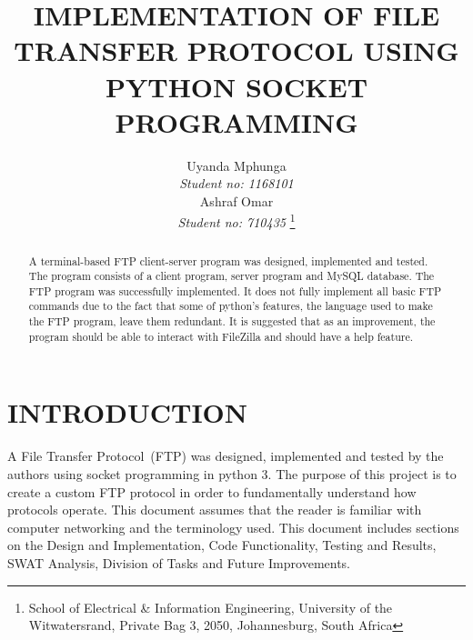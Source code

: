 \documentclass[journal, a4paper]{IEEEtran}
\begin{document}
\title{IMPLEMENTATION OF FILE TRANSFER PROTOCOL USING PYTHON SOCKET PROGRAMMING}

\author{Uyanda Mphunga \\ \textit{Student no: 1168101}\\ Ashraf Omar\\ \textit{Student no: 710435}
	\thanks{School of Electrical \& Information Engineering, University of the
		Witwatersrand, Private Bag 3, 2050, Johannesburg, South Africa}
}


%



\maketitle
\thispagestyle{empty}\pagestyle{empty}

\newlength\tindent
\setlength{\tindent}{\parindent}
\setlength{\parindent}{0pt}
\renewcommand{\indent}{\hspace*{\tindent}}

\begin{abstract}
A terminal-based FTP client-server program was designed, implemented and tested. The program consists of a client program, server program and MySQL database. The FTP program was successfully implemented. It does not fully implement all basic FTP commands due to the fact that some of python's features, the language used to make the FTP program, leave them redundant. It is suggested that as an improvement, the program should be able to interact with FileZilla and should have a help feature.
\end{abstract}

%
\section{INTRODUCTION}
A File Transfer Protocol~(FTP) was designed, implemented and tested by the authors using socket programming in python 3. The purpose of this project is to create a custom FTP protocol in order to fundamentally understand how protocols operate. This document assumes that the reader is familiar with computer networking and the terminology used. This document includes sections on the Design and Implementation, Code Functionality, Testing and Results, SWAT Analysis, Division of Tasks and Future Improvements. 
\end{document}
